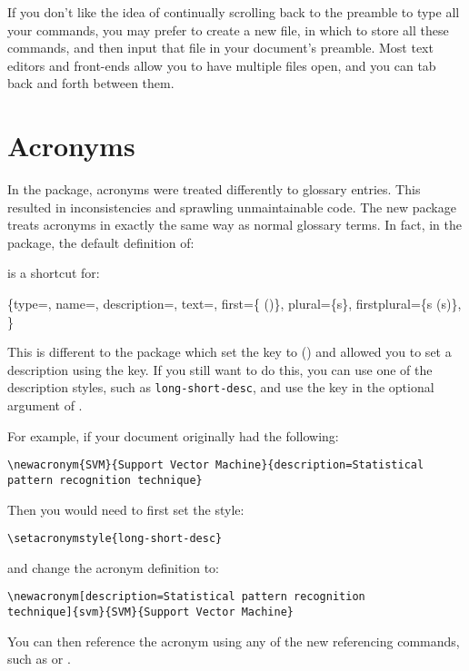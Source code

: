 \documentclass{nlctdoc}
\newcommand*{\acrstyle}[1]{\texttt{#1}}
\newenvironment{newway}{%
  \begin{labelledbox}{\styfmt{glossaries}}\ttfamily\obeylines
}{%
  \end{labelledbox}%
}
\begin{document}
If you don't like the idea of continually scrolling back to the
preamble to type all your  commands, you may
prefer to create a new file, in which to store all these commands,
and then input that file in your document's preamble. Most text
editors and front-ends allow you to have multiple files open, and
you can tab back and forth between them.

\section{Acronyms}

In the  package, acronyms were treated differently
to glossary entries. This resulted in inconsistencies and sprawling
unmaintainable code. The new  package treats
acronyms in exactly the same way as normal glossary terms. In fact,
in the  package, the default definition of:
\begin{newway}
\end{newway}
is a shortcut for:
\begin{newway}
\{type=,
name=,
description=,
text=,
first=\{ ()\},
plural=\{s\},
firstplural=\{s (s)\},
\}
\end{newway}

This is different to the  package which set the
 key to  () and
allowed you to set a description using the
 key. If you still want to do
this, you can use one of the description styles, such as
\acrstyle{long-short-desc}, and use
the  key in the optional
argument of .

For example, if your document originally had the following:
\begin{verbatim}
\newacronym{SVM}{Support Vector Machine}{description=Statistical
pattern recognition technique}
\end{verbatim}
Then you would need to first set the style:
\begin{verbatim}
\setacronymstyle{long-short-desc}
\end{verbatim}
and change the acronym definition to:
\begin{verbatim}
\newacronym[description=Statistical pattern recognition 
technique]{svm}{SVM}{Support Vector Machine}
\end{verbatim}
You can then reference the acronym using any of the new referencing
commands, such as  or .
\end{document}
